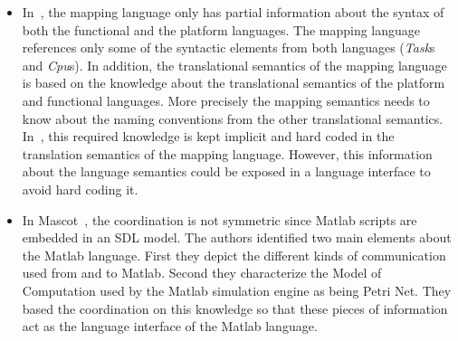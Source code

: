 \begin{itemize}
			\item In~\cite{dinatale}, the mapping language only has partial information about the syntax of both the functional and the platform languages. The mapping language references only some of the syntactic elements from both languages (\eg \emph{Task}s and \emph{Cpu}s). In addition, the translational semantics of the mapping language is based on the knowledge about the translational semantics of the platform and functional languages. More precisely the mapping semantics needs to know about the naming conventions from the other translational semantics. In~\cite{dinatale}, this required knowledge is kept implicit and hard coded in the translation semantics of the mapping language. However, this information about the language semantics could be exposed in a language interface to avoid hard coding it. 
			
			\item In Mascot~\cite{mascotbib}, the coordination is not symmetric since Matlab scripts are embedded in an SDL model.  The authors identified two main elements about the Matlab language. First they depict the different kinds of communication used from and to Matlab. Second they characterize the Model of Computation used by the Matlab simulation engine as being Petri Net. They based the coordination on this knowledge so that these pieces of information act as the language interface of the Matlab language. 
		\end{itemize}
